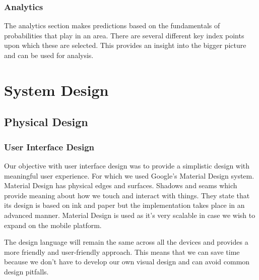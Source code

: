 \documentclass[BTech]{srmuthesis}
\begin{document}
\subsection{Analytics}
The analytics section makes predictions based on the fundamentals of probabilities that play in an area. There are several different key index points upon which these are selected. This provides an insight into the bigger picture and can be used for analysis.


\chapter{System Design}
\section{Physical Design}
\subsection{User Interface Design}
Our objective with user interface design was to provide a simplistic design with meaningful user experience. For which we used Google's Material Design system. Material Design has physical edges and surfaces. Shadows and seams which provide meaning about how we touch and interact with things. They state that its design is based on ink and paper but the implementation takes place in an advanced manner. Material Design is used as it's very scalable in case we wish to expand on the mobile platform.\par 
The design language will remain the same across all the devices and provides a more friendly and user-friendly approach. This means that we can save time because we don't have to develop our own visual design and can avoid common design pitfalls. \cite{wiki_system_design}
\end{document}
